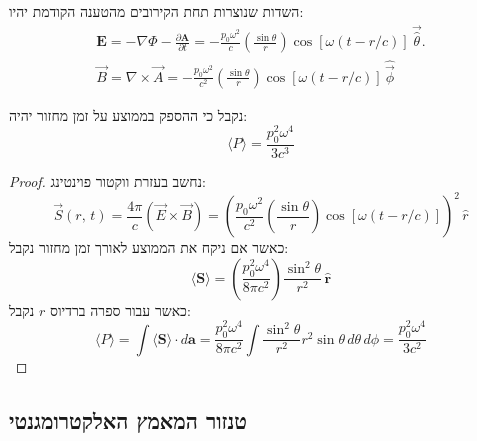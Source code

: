 \documentclass{tstextbook}
\begin{document}
\begin{corollary}
השדות שנוצרות תחת הקירובים מהטענה הקודמת יהיו:
$$\begin{gather}\mathbf{E}=-\nabla \Phi-{\frac{\partial\mathbf{A}}{\partial t}}=-{\frac{p_{0}\omega^{2}}{c}}\left({\frac{\sin\theta}{r}}\right)\cos\left[ \omega(t-r/c) \right]\,{\vec{\hat{\theta}}}. \\{\vec B}={\nabla\times{\vec A}}=-\frac{p_{0}\omega^{2}}{ c^{2}}\left(\frac{\sin\theta}{r}\right)\cos\left[ \omega(t-r/c) \right]\,{\hat{\vec{\phi}}}
\end{gather}$$

\end{corollary}
\begin{proposition}
נקבל כי ההספק בממוצע על זמן מחזור יהיה:
$$\langle P \rangle =\frac{p_{0}^{2}\omega^{4}}{3c^{3}}$$

\end{proposition}
\begin{proof}
נחשב בעזרת ווקטור פוינטינג:
$${\vec S\left( r,\,t \right)}=\frac{4\pi}{c}\left( {\vec E\times \vec B} \right)=\left(\frac{p_{0}\omega^{2}}{c^{2}}\left(\frac{\sin\theta}{r}\right)\cos\left[ \omega(t-r/c) \right]\right)^{2}\,{\hat{r}}$$
כאשר אם ניקח את הממוצע לאורך זמן מחזור נקבל:
$$\langle\mathbf{S}\rangle=\left({\frac{p_{0}^{2}\omega^{4}}{8\pi c^{2}}}\right){\frac{\sin^{2}\theta}{r^{2}}}\,\mathbf{\hat{r}}$$
כאשר עבור ספרה ברדיוס \(r\) נקבל:
$$\langle P\rangle=\int\langle\mathbf{S}\rangle\cdot d\mathbf{a}={\frac{p_{0}^{2}\omega^{4}}{8\pi c^{2}}}\int{\frac{\sin^{2}\theta}{r^{2}}}r^{2}\sin\theta\,d\theta\,d\phi={\frac{p_{0}^{2}\omega^{4}}{3 c^{2}}}$$

\end{proof}
\subsection{טנזור המאמץ האלקטרומגנטי}
\end{document}
